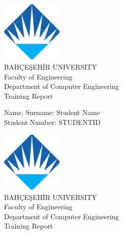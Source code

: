\documentclass[pdftex,12pt,a4paper]{extreport}
\begin{document}
\begin{titlepage}
\begin{center}

\includegraphics[height=3cm,width=3cm]{bau.png}\\
[1.0cm]
\Large BAHÇEŞEHİR UNIVERSITY\\
[3.0cm]
\Large Faculty of Engineering\\
[3.0cm]
\Large Department of Computer Engineering\\
[3.0cm]
\large Training Report\\
[4.0cm]
\end{center}
\large Name, Surname:
\large Student Name\\
\large Student Number:
\large STUDENTID\\
\vfill

\begin{center}

\includegraphics[height=3cm,width=3cm]{bau.png}\\
[1.0cm]
\Large BAHÇEŞEHİR UNIVERSITY\\
[3.0cm]
\Large Faculty of Engineering\\
[3.0cm]
\Large Department of Computer Engineering\\
[3.0cm]
\large Training Report\\
[4.0cm]
\end{center}
\vfill
\end{titlepage}
\end{document}
